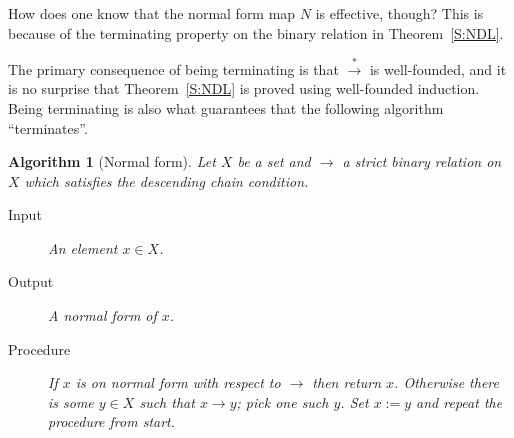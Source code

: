 \documentclass[12pt]{article}
\newtheorem{alg}{Algorithm}
\theoremstyle{definition}
\newtheorem{definition}{Definition}
\begin{document}
How does one know that the normal form map $N$ is effective, though? 
This is because of the terminating property on the binary relation 
in Theorem~\ref{S:NDL}.

%

The primary consequence of being terminating is that 
$\stackrel{*}{\rightarrow}$ is well-founded, and it is no surprise that Theorem~\ref{S:NDL} is proved using well-founded induction. Being terminating is also what guarantees that the following algorithm ``terminates''.

\begin{alg}[Normal form] \label{Alg:NormalForm}
  Let $X$ be a set and $\rightarrow$ a strict binary relation on $X$ 
  which satisfies the descending chain condition. 
  \begin{description}
    \item[Input]
      An element \(x \in X\).
    \item[Output]
      A normal form of $x$.
    \item[Procedure]
      If $x$ is on normal form with respect to $\rightarrow$ then 
      return $x$. Otherwise there is some \(y \in X\) such that \(x 
      \rightarrow y\); pick one such $y$. Set \(x:=y\) and repeat 
      the procedure from start.
  \end{description}
\end{alg}
\end{document}
